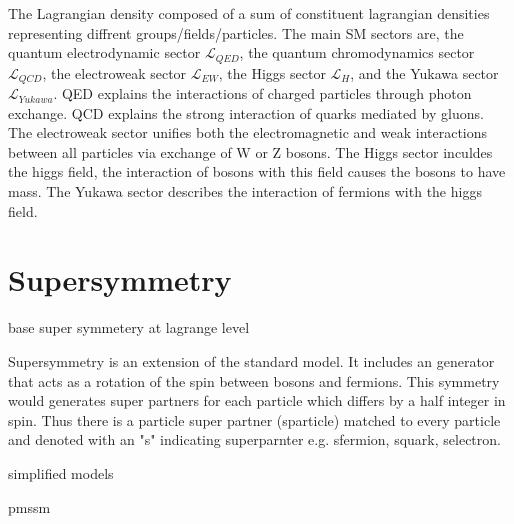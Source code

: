 
The Lagrangian density composed of a sum of constituent lagrangian densities representing diffrent groups/fields/particles. The main SM sectors are, the quantum electrodynamic sector $\mathcal{L}_{QED}$, the quantum chromodynamics sector $\mathcal{L}_{QCD}$, the electroweak sector $\mathcal{L}_{EW}$, the Higgs sector $\mathcal{L}_{H}$, and the Yukawa sector $\mathcal{L}_{Yukawa}$.  QED explains the interactions of charged particles through photon exchange. QCD explains the strong interaction of quarks mediated by gluons. The electroweak sector unifies both the electromagnetic and weak interactions between all particles via exchange of W or Z bosons. 
The Higgs sector inculdes the higgs field, the interaction of bosons with this field causes the bosons to have mass. The Yukawa sector describes the interaction of fermions with the higgs field.

\section{Supersymmetry}

base super symmetery at lagrange level

Supersymmetry is an extension of the standard model. It includes an generator that acts as a rotation of the spin between bosons and fermions. This symmetry would generates super partners for each particle which differs by a half integer in spin. Thus there is a particle super partner (sparticle) matched to every particle and denoted with an "s" indicating superparnter e.g. sfermion, squark, selectron. 


simplified models

pmssm
